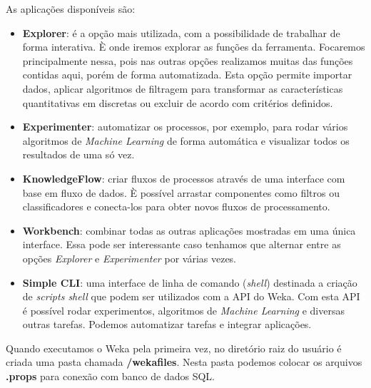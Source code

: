 \documentclass[a4paper,11pt]{article}
\begin{document}
As aplicações disponíveis são:
\begin{itemize}
	\item \textbf{Explorer}: é a opção mais utilizada, com a possibilidade de trabalhar de forma interativa. È onde iremos explorar as funções da ferramenta. Focaremos principalmente nessa, pois nas outras opções realizamos muitas das funções contidas aqui, porém de forma automatizada. Esta opção permite importar dados, aplicar algoritmos de filtragem para transformar as características quantitativas em discretas ou excluir de acordo com critérios definidos.
	\item \textbf{Experimenter}: automatizar os processos, por exemplo, para rodar vários algoritmos de \textit{Machine Learning} de forma automática e visualizar todos os resultados de uma só vez.
	\item \textbf{KnowledgeFlow}: criar fluxos de processos através de uma interface com base em fluxo de dados. È possível arrastar componentes como filtros ou classificadores e conecta-los para obter novos fluxos de processamento.
	\item \textbf{Workbench}: combinar todas as outras aplicações mostradas em uma única interface. Essa pode ser interessante caso tenhamos que alternar entre as opções \textit{Explorer} e \textit{Experimenter} por várias vezes.
	\item \textbf{Simple CLI}: uma interface de linha de comando (\textit{shell}) destinada a criação de \textit{scripts shell} que podem ser utilizados com a API do Weka. Com esta API é possível rodar experimentos, algoritmos de \textit{Machine Learning} e diversas outras tarefas. Podemos automatizar tarefas e integrar aplicações.
\end{itemize}

\begin{theo}{}
	Quando executamos o Weka pela primeira vez, no diretório raiz do usuário é criada uma pasta chamada \textbf{/wekafiles}. Nesta pasta podemos colocar os arquivos \textbf{.props} para conexão com banco de dados SQL.
\end{theo}
\end{document}
